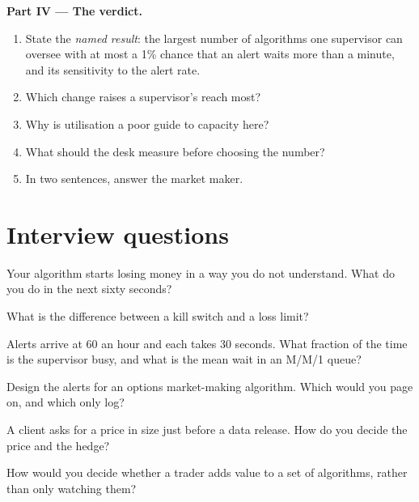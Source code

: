 \begin{problem}
\medskip\noindent\textbf{Part IV --- The verdict.}
\begin{enumerate}[resume]
\item State the \emph{named result}: the largest number of algorithms one supervisor can oversee with at most a 1\% chance
that an alert waits more than a minute, and its sensitivity to the alert rate.
\item Which change raises a supervisor's reach most?
\item Why is utilisation a poor guide to capacity here?
\item What should the desk measure before choosing the number?
\item In two sentences, answer the market maker.
\end{enumerate}
\end{problem}

\section{Interview questions}

\begin{interviewq}\label{iq:in:trader:1}
Your algorithm starts losing money in a way you do not understand. What do you do in the next sixty seconds?
\end{interviewq}

\begin{interviewq}\label{iq:in:trader:2}
What is the difference between a kill switch and a loss limit?
\end{interviewq}

\begin{interviewq}\label{iq:in:trader:3}
Alerts arrive at 60 an hour and each takes 30 seconds. What fraction of the time is the supervisor busy, and what is the
mean wait in an M/M/1 queue?
\end{interviewq}

\begin{interviewq}\label{iq:in:trader:4}
Design the alerts for an options market-making algorithm. Which would you page on, and which only log?
\end{interviewq}

\begin{interviewq}\label{iq:in:trader:5}
A client asks for a price in size just before a data release. How do you decide the price and the hedge?
\end{interviewq}

\begin{interviewq}\label{iq:in:trader:6}
How would you decide whether a trader adds value to a set of algorithms, rather than only watching them?
\end{interviewq}
